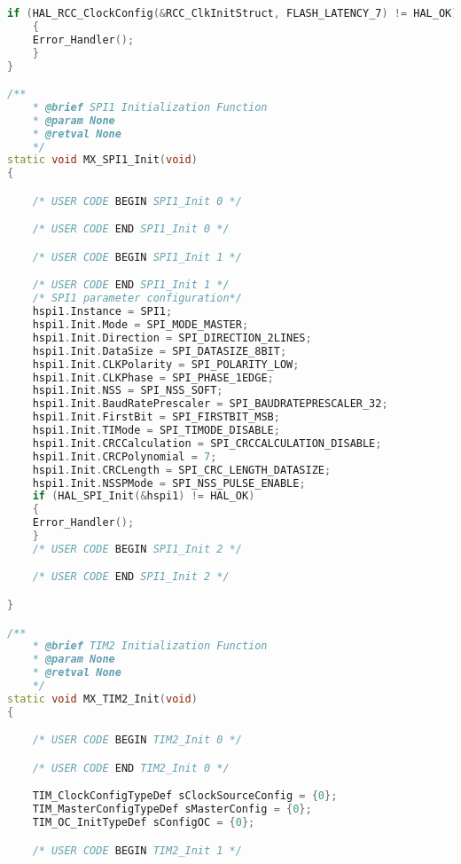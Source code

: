 \begin{lstlisting}[language=C++]
    if (HAL_RCC_ClockConfig(&RCC_ClkInitStruct, FLASH_LATENCY_7) != HAL_OK)
    {
    Error_Handler();
    }
}

/**
    * @brief SPI1 Initialization Function
    * @param None
    * @retval None
    */
static void MX_SPI1_Init(void)
{

    /* USER CODE BEGIN SPI1_Init 0 */

    /* USER CODE END SPI1_Init 0 */

    /* USER CODE BEGIN SPI1_Init 1 */

    /* USER CODE END SPI1_Init 1 */
    /* SPI1 parameter configuration*/
    hspi1.Instance = SPI1;
    hspi1.Init.Mode = SPI_MODE_MASTER;
    hspi1.Init.Direction = SPI_DIRECTION_2LINES;
    hspi1.Init.DataSize = SPI_DATASIZE_8BIT;
    hspi1.Init.CLKPolarity = SPI_POLARITY_LOW;
    hspi1.Init.CLKPhase = SPI_PHASE_1EDGE;
    hspi1.Init.NSS = SPI_NSS_SOFT;
    hspi1.Init.BaudRatePrescaler = SPI_BAUDRATEPRESCALER_32;
    hspi1.Init.FirstBit = SPI_FIRSTBIT_MSB;
    hspi1.Init.TIMode = SPI_TIMODE_DISABLE;
    hspi1.Init.CRCCalculation = SPI_CRCCALCULATION_DISABLE;
    hspi1.Init.CRCPolynomial = 7;
    hspi1.Init.CRCLength = SPI_CRC_LENGTH_DATASIZE;
    hspi1.Init.NSSPMode = SPI_NSS_PULSE_ENABLE;
    if (HAL_SPI_Init(&hspi1) != HAL_OK)
    {
    Error_Handler();
    }
    /* USER CODE BEGIN SPI1_Init 2 */

    /* USER CODE END SPI1_Init 2 */

}

/**
    * @brief TIM2 Initialization Function
    * @param None
    * @retval None
    */
static void MX_TIM2_Init(void)
{

    /* USER CODE BEGIN TIM2_Init 0 */

    /* USER CODE END TIM2_Init 0 */

    TIM_ClockConfigTypeDef sClockSourceConfig = {0};
    TIM_MasterConfigTypeDef sMasterConfig = {0};
    TIM_OC_InitTypeDef sConfigOC = {0};

    /* USER CODE BEGIN TIM2_Init 1 */


\end{lstlisting}
